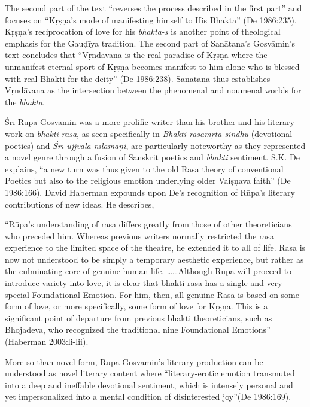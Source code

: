 The second part of the text “reverses the process described in the first part” and focuses on “Kṛṣṇa’s mode of manifesting himself to His Bhakta” (De 1986:235). Kṛṣṇa’s reciprocation of love for his {\sl bhakta-s} is another point of theological emphasis for the Gauḍīya tradition. The second part of Sanātana’s Gosvāmin’s text concludes that “Vṛndāvana is the real paradise of Kṛṣṇa where the unmanifest eternal sport of Kṛṣṇa becomes manifest to him alone who is blessed with real Bhakti for the deity” (De 1986:238). Sanātana thus establishes Vṛndāvana as the intersection between the phenomenal and noumenal worlds for the {\sl bhakta}. 

Śrī Rūpa Gosvāmin was a more prolific writer than his brother and his literary work on {\sl bhakti rasa}, as seen specifically in {\sl Bhakti-rasāmṛta-sindhu} (devotional poetics) and {\sl Śrī-ujjvala-nīlamaṇi}, are particularly noteworthy as they represented a novel genre through a fusion of Sanskrit poetics and {\sl bhakti} sentiment. S.K. De explains, “a new turn was thus given to the old Rasa theory of conventional Poetics but also to the religious emotion underlying older Vaiṣṇava faith” (De 1986:166). David Haberman expounds upon De’s recognition of Rūpa’s literary contributions of new ideas. He describes, 
\begin{myquote}
\eleven
“Rūpa’s understanding of rasa differs greatly from those of other theoreticians who preceded him. Whereas previous writers normally restricted the rasa experience to the limited space of the theatre, he extended it to all of life. Rasa is now not understood to be simply a temporary aesthetic experience, but rather as the culminating core of genuine human life. ……Although Rūpa will proceed to introduce variety into love, it is clear that bhakti-rasa has a single and very special Foundational Emotion. For him, then, all genuine Rasa is based on some form of love, or more specifically, some form of love for Kṛṣṇa. This is a significant point of departure from previous bhakti theoreticians, such as Bhojadeva, who recognized the traditional nine Foundational Emotions”  \hfill 	(Haberman 2003:li-lii). 
\end{myquote}

More so than novel form, Rūpa Gosvāmin’s literary production can be understood as novel literary content where “literary-erotic emotion transmuted into a deep and ineffable devotional sentiment, which is intensely personal and yet impersonalized into a mental condition of disinterested joy”(De 1986:169). 

